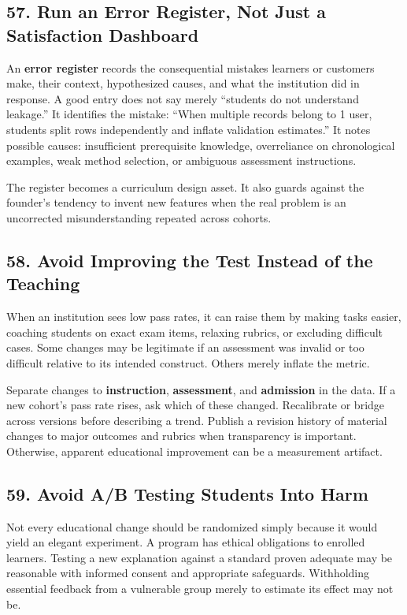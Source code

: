 \subsection*{57. Run an Error Register, Not Just a Satisfaction Dashboard}

An \textbf{error register} records the consequential mistakes learners or customers make, their context, hypothesized causes, and what the institution did in response. A good entry does not say merely ``students do not understand leakage.'' It identifies the mistake: ``When multiple records belong to 1 user, students split rows independently and inflate validation estimates.'' It notes possible causes: insufficient prerequisite knowledge, overreliance on chronological examples, weak method selection, or ambiguous assessment instructions.

The register becomes a curriculum design asset. It also guards against the founder's tendency to invent new features when the real problem is an uncorrected misunderstanding repeated across cohorts.

\subsection*{58. Avoid Improving the Test Instead of the Teaching}

When an institution sees low pass rates, it can raise them by making tasks easier, coaching students on exact exam items, relaxing rubrics, or excluding difficult cases. Some changes may be legitimate if an assessment was invalid or too difficult relative to its intended construct. Others merely inflate the metric.

Separate changes to \textbf{instruction}, \textbf{assessment}, and \textbf{admission} in the data. If a new cohort's pass rate rises, ask which of these changed. Recalibrate or bridge across versions before describing a trend. Publish a revision history of material changes to major outcomes and rubrics when transparency is important. Otherwise, apparent educational improvement can be a measurement artifact.

\subsection*{59. Avoid A/B Testing Students Into Harm}

Not every educational change should be randomized simply because it would yield an elegant experiment. A program has ethical obligations to enrolled learners. Testing a new explanation against a standard proven adequate may be reasonable with informed consent and appropriate safeguards. Withholding essential feedback from a vulnerable group merely to estimate its effect may not be.

